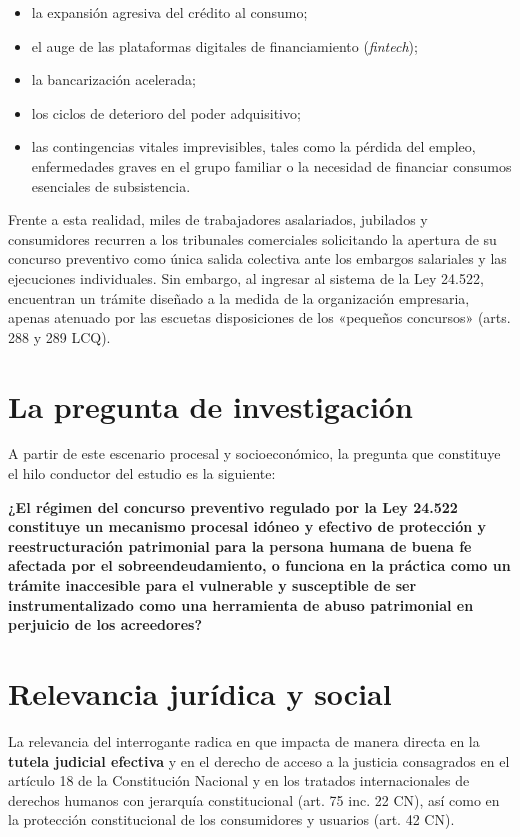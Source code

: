 \documentclass[12pt,oneside]{book}
\begin{document}
\begin{itemize}
    \item la expansión agresiva del crédito al consumo;
    \item el auge de las plataformas digitales de financiamiento (\textit{fintech});
    \item la bancarización acelerada;
    \item los ciclos de deterioro del poder adquisitivo;
    \item las contingencias vitales imprevisibles, tales como la pérdida del empleo, enfermedades graves en el grupo familiar o la necesidad de financiar consumos esenciales de subsistencia.
\end{itemize}

Frente a esta realidad, miles de trabajadores asalariados, jubilados y consumidores recurren a los tribunales comerciales solicitando la apertura de su concurso preventivo como única salida colectiva ante los embargos salariales y las ejecuciones individuales. Sin embargo, al ingresar al sistema de la Ley 24.522, encuentran un trámite diseñado a la medida de la organización empresaria, apenas atenuado por las escuetas disposiciones de los «pequeños concursos» (arts. 288 y 289 LCQ).

\section{La pregunta de investigación}

A partir de este escenario procesal y socioeconómico, la pregunta que constituye el hilo conductor del estudio es la siguiente:

\begin{important}
\textbf{¿El régimen del concurso preventivo regulado por la Ley 24.522 constituye un mecanismo procesal idóneo y efectivo de protección y reestructuración patrimonial para la persona humana de buena fe afectada por el sobreendeudamiento, o funciona en la práctica como un trámite inaccesible para el vulnerable y susceptible de ser instrumentalizado como una herramienta de abuso patrimonial en perjuicio de los acreedores?}
\end{important}

\section{Relevancia jurídica y social}

La relevancia del interrogante radica en que impacta de manera directa en la \textbf{tutela judicial efectiva} y en el derecho de acceso a la justicia consagrados en el artículo 18 de la Constitución Nacional y en los tratados internacionales de derechos humanos con jerarquía constitucional (art. 75 inc. 22 CN), así como en la protección constitucional de los consumidores y usuarios (art. 42 CN).
\end{document}
